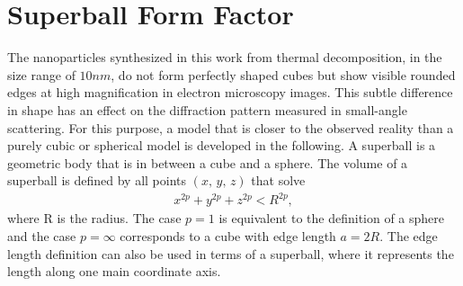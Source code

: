 \documentclass[\main/dresen_thesis.tex]{subfiles}
\begin{document}
\section{Superball Form Factor}\label{ch:appendix:numericalMethods:superballFormfactor}

The nanoparticles synthesized in this work from thermal decomposition, in the size range of $10 \unit{nm}$, do not form perfectly shaped cubes but show visible rounded edges at high magnification in electron microscopy images.
This subtle difference in shape has an effect on the diffraction pattern measured in small-angle scattering.
For this purpose, a model that is closer to the observed reality than a purely cubic or spherical model is developed in the following.
A superball is a geometric body that is in between a cube and a sphere.
The volume of a superball is defined by all points $(x,\, y,\, z)$ that solve
\begin{align}
x^{2p} + y^{2p} + z^{2p} < R^{2p},
\end{align}
where R is the radius.  The case $p=1$ is equivalent to the definition of a sphere and the case $p=\infty$ corresponds to a cube with edge length $a=2R$.
The edge length definition can also be used in terms of a superball, where it represents the length along one main coordinate axis.
\end{document}
